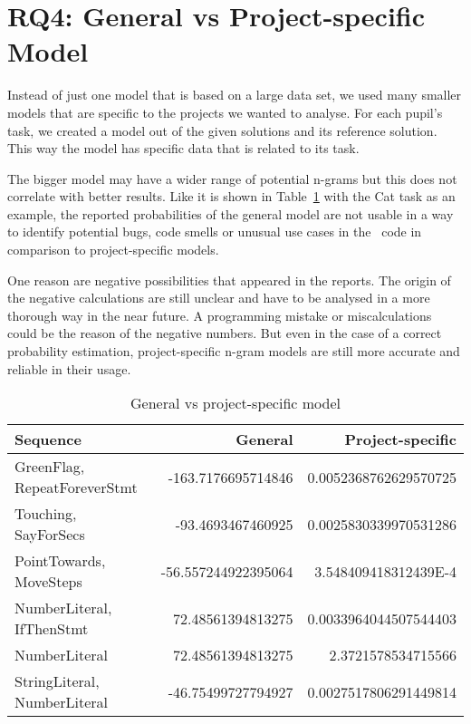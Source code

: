 \section{RQ4: General vs Project-specific Model}\label{sec:project-specific}
Instead of just one model that is based on a large data set, we used many smaller models that are specific to the projects we wanted to analyse. For each pupil's task, we created a model out of the given solutions and its reference solution. This way the model has specific data that is related to its task.

The bigger model may have a wider range of potential n-grams but this does not correlate with better results. Like it is shown in Table~\ref{tab:versus} with the Cat task as an example, the reported probabilities of the general model are not usable in a way to identify potential bugs, code smells or unusual use cases in the \scratch\ code in comparison to project-specific models. 

One reason are negative possibilities that appeared in the reports. The origin of the negative calculations are still unclear and have to be analysed in a more thorough way in the near future. A programming mistake or miscalculations could be the reason of the negative numbers. But even in the case of a correct probability estimation, project-specific n-gram models are still more accurate and reliable in their usage.  

\begin{table}[H]
    \centering
    \caption[General vs project-specific model]{\label{tab:versus}General vs project-specific model}
    \begin{tabular}{lrr}
        \toprule
        Sequence & General & Project-specific \\
        \midrule
        GreenFlag, RepeatForeverStmt & -163.7176695714846 & 0.0052368762629570725 \\
        Touching, SayForSecs & -93.4693467460925 & 0.0025830339970531286 \\
        PointTowards, MoveSteps & -56.557244922395064 & 3.548409418312439E-4 \\
        NumberLiteral, IfThenStmt & 72.48561394813275 & 0.0033964044507544403 \\
        NumberLiteral & 72.48561394813275 & 2.3721578534715566 \\
        StringLiteral, NumberLiteral & -46.75499727794927 & 0.0027517806291449814 \\
        \bottomrule
    \end{tabular}
\end{table}


